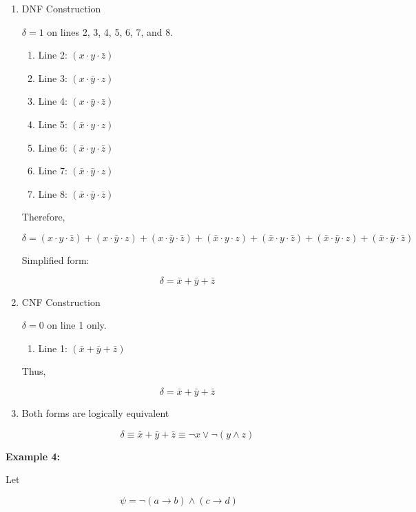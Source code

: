 \documentclass[12pt,a4paper,openany]{article}
\begin{document}
\begin{enumerate}
\item DNF Construction

  $\delta = 1$ on lines 2, 3, 4, 5, 6, 7, and 8.

  \begin{enumerate}
  \item Line 2: $(x \cdot y \cdot \bar{z})$
  \item Line 3: $(x \cdot \bar{y} \cdot z)$
  \item Line 4: $(x \cdot \bar{y} \cdot \bar{z})$
  \item Line 5: $(\bar{x} \cdot y \cdot z)$
  \item Line 6: $(\bar{x} \cdot y \cdot \bar{z})$
  \item Line 7: $(\bar{x} \cdot \bar{y} \cdot z)$
  \item Line 8: $(\bar{x} \cdot \bar{y} \cdot \bar{z})$
  \end{enumerate}

  Therefore,

  $$
   \delta = (x \cdot y \cdot \bar{z}) + (x \cdot \bar{y} \cdot z) + (x \cdot \bar{y} \cdot \bar{z}) + (\bar{x} \cdot y \cdot z) + (\bar{x} \cdot y \cdot \bar{z}) + (\bar{x} \cdot \bar{y} \cdot z) + (\bar{x} \cdot \bar{y} \cdot \bar{z})
   $$
   
   Simplified form:
   
   $$
   \delta = \bar{x} + \bar{y} + \bar{z}
   $$

\item CNF Construction

  $\delta = 0$ on line 1 only.

  \begin{enumerate}
  \item Line 1: $(\bar{x} + \bar{y} + \bar{z})$
  \end{enumerate}

  Thus,

  $$
   \delta = \bar{x} + \bar{y} + \bar{z}
   $$

\item Both forms are logically equivalent

  $$
   \delta \equiv \bar{x} + \bar{y} + \bar{z} \equiv \neg x \lor \neg(y \land z)
   $$
\end{enumerate}

\newpage

\textbf{Example 4:}

Let

$$\psi = \neg(a \to b) \land (c \to d)$$
\end{document}
